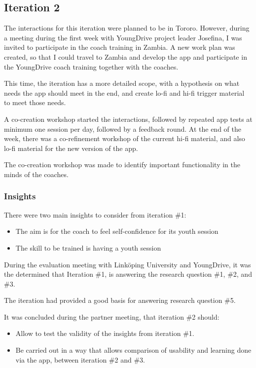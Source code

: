 \subsection{Iteration 2}

The interactions for this iteration were planned to be in Tororo. However, during a meeting during the first week with YoungDrive project leader Josefina, I was invited to participate in the coach training in Zambia. A new work plan was created, so that I could travel to Zambia and develop the app and participate in the YoungDrive coach training together with the coaches.

This time, the iteration has a more detailed scope, with a hypothesis on what needs the app should meet in the end, and create lo-fi and hi-fi trigger material to meet those needs.

A co-creation workshop started the interactions, followed by repeated app tests at minimum one session per day, followed by a feedback round. At the end of the week, there was a co-refinement workshop of the current hi-fi material, and also lo-fi material for the new version of the app.

The co-creation workshop was made to identify important functionality in the minds of the coaches.

\subsubsection*{Insights}

There were two main insights to consider from iteration \#1:

\begin{itemize}
\item The aim is for the coach to feel self-confidence for its youth session
\item The skill to be trained is having a youth session
\end{itemize}

During the evaluation meeting with Linköping University and YoungDrive, it was the determined that Iteration \#1, is answering the research question \#1, \#2, and \#3.

The iteration had provided a good basis for answering research question \#5.

It was concluded during the partner meeting, that iteration \#2 should:

\begin{itemize}
\item Allow to test the validity of the insights from iteration \#1.
\item Be carried out in a way that allows comparison of usability and learning done via the app, between iteration \#2 and \#3.
\end{itemize}

